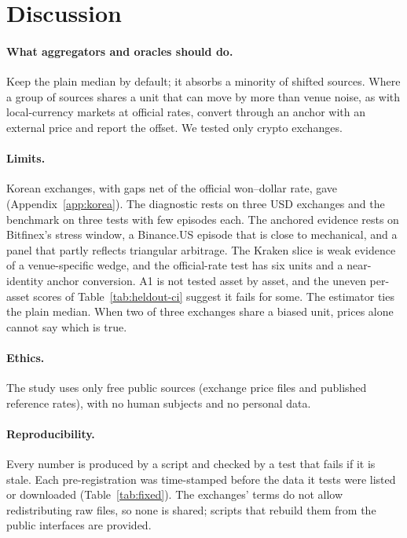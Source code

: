 \documentclass[sigconf,review,anonymous]{acmart}
\begin{document}
\section{Discussion}
\label{sec:discussion}
\paragraph{What aggregators and oracles should do.} Keep the plain median by default; it absorbs a minority of shifted
sources. Where a group of sources shares a unit that can move by more than venue noise, as with local-currency markets
at official rates, convert through an anchor with an external price and report the offset. We tested only crypto exchanges.

\paragraph{Limits.} Korean exchanges, with gaps net of the official won--dollar rate, gave \NumKRAnchMeanIv{} (Appendix~\ref{app:korea}). The diagnostic rests on three USD exchanges and the benchmark on three tests with few episodes each. The anchored evidence rests on Bitfinex's stress window, a Binance.US episode that is close to mechanical, and a panel that partly reflects triangular arbitrage. The Kraken slice
is weak evidence of a venue-specific wedge, and the official-rate test has six units and a near-identity anchor conversion. A1 is not tested asset by
asset, and the uneven per-asset scores of Table~\ref{tab:heldout-ci} suggest it fails for some. The estimator ties the plain
median. When two of three exchanges share a biased unit, prices alone cannot say which is true.

\paragraph{Ethics.} The study uses only free public sources (exchange price files and published reference rates), with no human subjects and no personal data.

\paragraph{Reproducibility.} Every number is produced by a script and checked by a test that fails if it is stale. Each
pre-registration was time-stamped before the data it tests were listed or downloaded (Table~\ref{tab:fixed}). The exchanges' terms do not
allow redistributing raw files, so none is shared; scripts that rebuild them from the public interfaces are provided.
\end{document}
